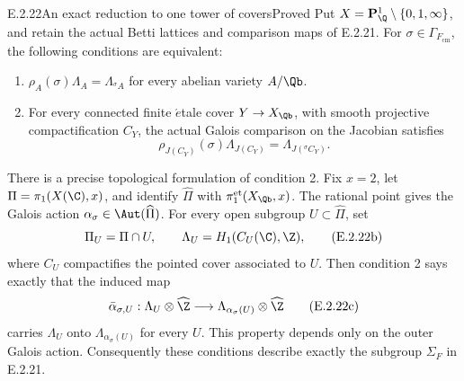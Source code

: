 \begin{result}{E.2.22}{An exact reduction to one tower of covers}{Proved}
Put \(X=\mathbf P^1_{\Q}\setminus\{0,1,\infty\}\), and retain
the actual Betti lattices and comparison maps of E.2.21.
For \(\sigma\in\Gamma_{F_{\mathrm{cm}}}\), the following
conditions are equivalent:
\begin{enumerate}
\item \(\rho_A(\sigma)\Lambda_A=\Lambda_{{}^{\sigma}A}\)
for every abelian variety \(A/\Qb\).
\item For every connected finite \(\acute{e}\)tale cover
\(Y\to X_{\Qb}\), with smooth projective compactification
\(C_Y\), the actual Galois comparison on the Jacobian satisfies
\[
 \rho_{J(C_Y)}(\sigma)\Lambda_{J(C_Y)}
       =\Lambda_{J({}^{\sigma}C_Y)}.
 \tag{E.2.22a}
\]
\end{enumerate}
There is a precise topological formulation of condition 2.
Fix \(x=2\), let \(\Pi=\pi_1(X(\C),x)\), and identify
\(\widehat\Pi\) with \(\pi_1^{\mathrm{et}}(X_{\Qb},x)\).
The rational point gives the Galois action
\(\alpha_\sigma\in\Aut(\widehat\Pi)\).
For every open subgroup \(U\subset\widehat\Pi\), set
\[
 \Pi_U=\Pi\cap U,\qquad
 \Lambda_U=H_1(C_U(\C),\Z),
 \tag{E.2.22b}
\]
where \(C_U\) compactifies the pointed cover associated to \(U\).
Then condition 2 says exactly that the induced map
\[
 \bar\alpha_{\sigma,U}:
 \Lambda_U\otimes\widehat\Z
       \longrightarrow
 \Lambda_{\alpha_\sigma(U)}\otimes\widehat\Z
 \tag{E.2.22c}
\]
carries \(\Lambda_U\) onto \(\Lambda_{\alpha_\sigma(U)}\)
for every \(U\). This property depends only on the outer
Galois action. Consequently these conditions describe exactly
the subgroup \(\Sigma_F\) in E.2.21.
\end{result}
